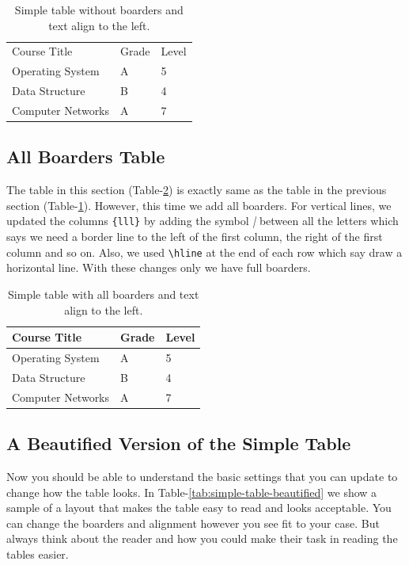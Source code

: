 \begin{table}[H]
    \centering
    \begin{tabular}{lll}
        Course Title      & Grade & Level \\
        Operating System  & A     & 5     \\
        Data Structure    & B     & 4     \\
        Computer Networks & A     & 7     \\
    \end{tabular}
    \caption{Simple table without boarders and text align to the left.}
    \label{tab:simple-table}
\end{table}


\subsection{All Boarders Table}

The table in this section (Table-\ref{tab:simple-table-all-boarders}) is exactly same as the table in the previous section (Table-\ref{tab:simple-table}). However, this time we add all boarders. For vertical lines, we updated the columns \verb|{lll}| by adding the symbol \emph{|} between all the letters which says we need a border line to the left of the first column, the right of the first column and so on. Also, we used \verb|\hline| at the end of each row which say draw a horizontal line. With these changes only we have full boarders. 

\begin{table}[H]
    \centering
    \begin{tabular}{|l|l|l|}
        \hline
        Course Title      & Grade & Level \\ \hline
        Operating System  & A     & 5     \\ \hline
        Data Structure    & B     & 4     \\ \hline
        Computer Networks & A     & 7     \\ \hline
    \end{tabular}
    \caption{Simple table with all boarders and text align to the left.}
    \label{tab:simple-table-all-boarders}
\end{table}


\subsection{A Beautified Version of the Simple Table}

Now you should be able to understand the basic settings that you can update to change how the table looks. In Table-\ref{tab:simple-table-beautified} we show a sample of a layout that makes the table easy to read and looks acceptable. You can change the boarders and alignment however you see fit to your case. But always think about the reader and how you could make their task in reading the tables easier.

